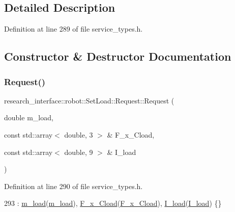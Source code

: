 \subsection{Detailed Description}


Definition at line 289 of file service\+\_\+types.\+h.



\subsection{Constructor \& Destructor Documentation}
\mbox{\label{structresearch__interface_1_1robot_1_1SetLoad_1_1Request_ace6c0a8ca9a219463c13e40ef9eb52b4}} 
\subsubsection{\texorpdfstring{Request()}{Request()}}
{\footnotesize\ttfamily research\+\_\+interface\+::robot\+::\+Set\+Load\+::\+Request\+::\+Request (\begin{DoxyParamCaption}\item[{double}]{m\+\_\+load,  }\item[{const std\+::array$<$ double, 3 $>$ \&}]{F\+\_\+x\+\_\+\+Cload,  }\item[{const std\+::array$<$ double, 9 $>$ \&}]{I\+\_\+load }\end{DoxyParamCaption})\hspace{0.3cm}{\ttfamily [inline]}}



Definition at line 290 of file service\+\_\+types.\+h.


\begin{DoxyCode}
293         : \hyperlink{structresearch__interface_1_1robot_1_1SetLoad_1_1Request_a448ff490c711178d91f1c96f80c36c1a}{m\_load}(\hyperlink{structresearch__interface_1_1robot_1_1SetLoad_1_1Request_a448ff490c711178d91f1c96f80c36c1a}{m\_load}), \hyperlink{structresearch__interface_1_1robot_1_1SetLoad_1_1Request_ad53be7a51f527a2e41572b5563cc184f}{F\_x\_Cload}(\hyperlink{structresearch__interface_1_1robot_1_1SetLoad_1_1Request_ad53be7a51f527a2e41572b5563cc184f}{F\_x\_Cload}), 
      \hyperlink{structresearch__interface_1_1robot_1_1SetLoad_1_1Request_a8f3eee012a9017c0140c10ec2d5f35ca}{I\_load}(\hyperlink{structresearch__interface_1_1robot_1_1SetLoad_1_1Request_a8f3eee012a9017c0140c10ec2d5f35ca}{I\_load}) \{\}
\end{DoxyCode}


